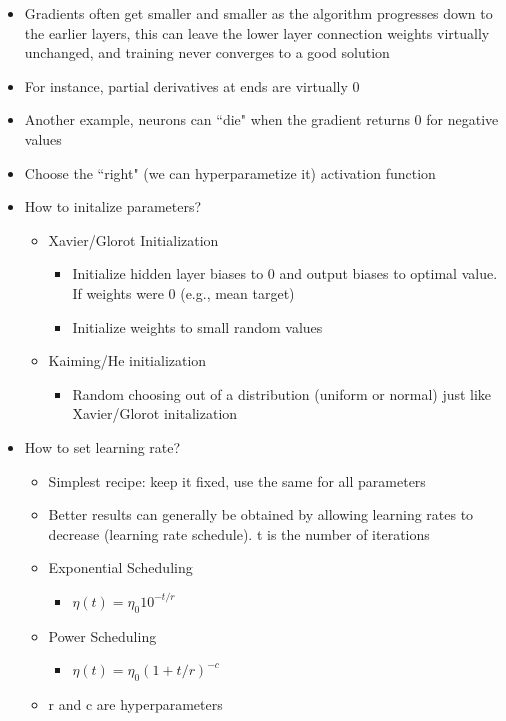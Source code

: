 \documentclass[10pt, oneside]{article}
\begin{document}
\begin{itemize}
    \item Gradients often get smaller and smaller as the algorithm progresses down to the earlier layers, this can leave the lower layer connection weights virtually unchanged, and training never converges to a good solution
    \item For instance, partial derivatives at ends are virtually 0
    \item Another example, neurons can ``die" when the gradient returns 0 for negative values
    \item Choose the ``right" (we can hyperparametize it) activation function
    \item How to initalize parameters?
    \begin{itemize}
        \item Xavier/Glorot Initialization
        \begin{itemize}
            \item Initialize hidden layer biases to 0 and output biases to optimal value. If weights were 0 (e.g., mean target)
            \item Initialize weights to small random values
        \end{itemize}
        \item Kaiming/He initialization
        \begin{itemize}
            \item Random choosing out of a distribution (uniform or normal) just like Xavier/Glorot initalization
        \end{itemize}
    \end{itemize}
    \item How to set learning rate?
    \begin{itemize}
        \item Simplest recipe: keep it fixed, use the same for all parameters
        \item Better results can generally be obtained by allowing learning rates to decrease (learning rate schedule). t is the number of iterations
        \item Exponential Scheduling
        \begin{itemize}
            \item $\eta(t) = \eta_0 10^{-t/r}$
        \end{itemize}
        \item Power Scheduling
        \begin{itemize}
            \item $\eta(t) = \eta_0 (1 + t/r)^{-c}$
        \end{itemize}
        \item r and c are hyperparameters
    \end{itemize}
\end{itemize}
\end{document}
